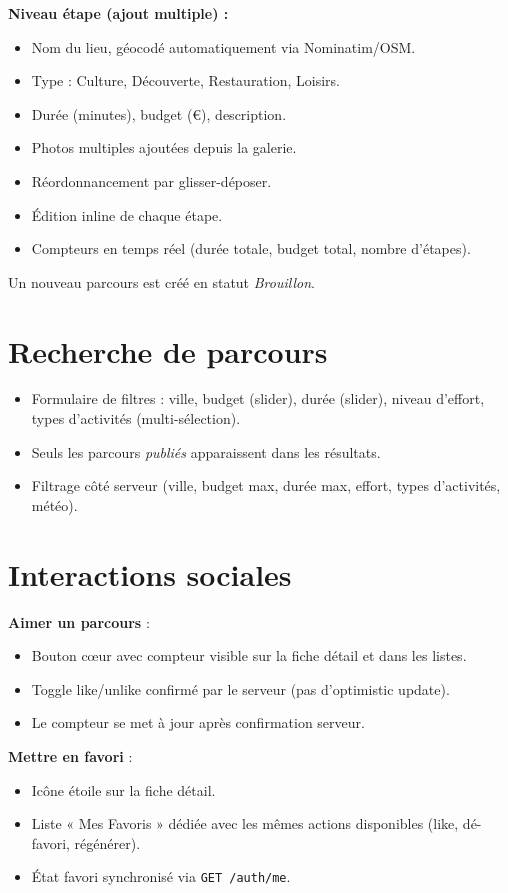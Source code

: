 \documentclass[12pt, a4paper, openany]{report}
\begin{document}
\textbf{Niveau étape (ajout multiple) :}
\begin{itemize}
  \item Nom du lieu, géocodé automatiquement via Nominatim/OSM.
  \item Type : Culture, Découverte, Restauration, Loisirs.
  \item Durée (minutes), budget (€), description.
  \item Photos multiples ajoutées depuis la galerie.
  \item Réordonnancement par glisser-déposer.
  \item Édition inline de chaque étape.
  \item Compteurs en temps réel (durée totale, budget total, nombre d'étapes).
\end{itemize}

Un nouveau parcours est créé en statut \textit{Brouillon}.

\section{Recherche de parcours}

\begin{itemize}
  \item Formulaire de filtres : ville, budget (slider), durée (slider), niveau d'effort,
    types d'activités (multi-sélection).
  \item Seuls les parcours \textit{publiés} apparaissent dans les résultats.
  \item Filtrage côté serveur (ville, budget max, durée max, effort, types d'activités, météo).
\end{itemize}

\section{Interactions sociales}

\textbf{Aimer un parcours} :
\begin{itemize}
  \item Bouton cœur avec compteur visible sur la fiche détail et dans les listes.
  \item Toggle like/unlike confirmé par le serveur (pas d'optimistic update).
  \item Le compteur se met à jour après confirmation serveur.
\end{itemize}

\textbf{Mettre en favori} :
\begin{itemize}
  \item Icône étoile sur la fiche détail.
  \item Liste « Mes Favoris » dédiée avec les mêmes actions disponibles
    (like, dé-favori, régénérer).
  \item État favori synchronisé via \texttt{GET /auth/me}.
\end{itemize}
\end{document}
